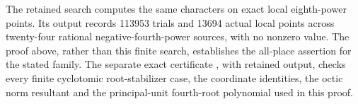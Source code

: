 The retained search
computes the same characters on exact local eighth-power
points. Its output records 113953 trials and 13694
actual local points across twenty-four rational
negative-fourth-power sources, with no nonzero value.
The proof above, rather than this finite search,
establishes the all-place assertion for the stated family.
The separate exact certificate
,
with retained output, checks every finite cyclotomic
root-stabilizer case, the coordinate identities, the
octic norm resultant and the principal-unit fourth-root
polynomial used in this proof.

